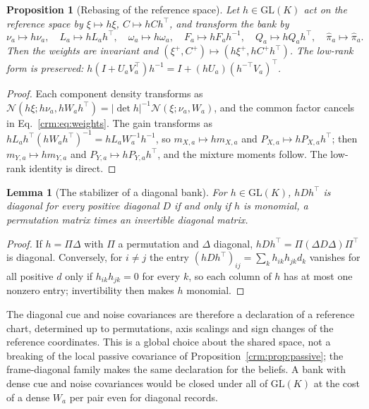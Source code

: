 \documentclass[11pt]{article}
\newtheorem{proposition}[theorem]{Proposition}
\newtheorem{lemma}[theorem]{Lemma}
\theoremstyle{definition}
\theoremstyle{remark}
\providecommand{\GL}{\mathrm{GL}}
\newcommand{\Gauss}{\mathcal N}
\newcommand{\pihat}{\hat\pi}
\begin{document}
\begin{proposition}[Rebasing of the reference space]
\label{crm:prop:rebasing}
Let $h\in\GL(K)$ act on the reference space by $\xi\mapsto h\xi$, $C\mapsto hCh^\top$, and transform the bank by
\begin{equation}
\nu_a\mapsto h\nu_a,\quad L_a\mapsto hL_ah^\top,\quad \omega_a\mapsto h\omega_a,\quad F_a\mapsto hF_ah^{-1},\quad Q_a\mapsto hQ_ah^\top,\quad \pihat_a\mapsto\pihat_a.
\label{crm:eq:rebasing}
\end{equation}
Then the weights are invariant and $(\xi^+,C^+)\mapsto(h\xi^+,hC^+h^\top)$. The low-rank form is preserved: $h(I+U_aV_a^\top)h^{-1}=I+(hU_a)(h^{-\top}V_a)^\top$.
\end{proposition}

\begin{proof}
Each component density transforms as $\Gauss(h\xi;h\nu_a,hW_ah^\top)=|\det h|^{-1}\Gauss(\xi;\nu_a,W_a)$, and the common factor cancels in Eq.~\eqref{crm:eq:weights}. The gain transforms as $hL_ah^\top(hW_ah^\top)^{-1}=hL_aW_a^{-1}h^{-1}$, so $m_{X,a}\mapsto hm_{X,a}$ and $P_{X,a}\mapsto hP_{X,a}h^\top$; then $m_{Y,a}\mapsto hm_{Y,a}$ and $P_{Y,a}\mapsto hP_{Y,a}h^\top$, and the mixture moments follow. The low-rank identity is direct.
\end{proof}

\begin{lemma}[The stabilizer of a diagonal bank]
\label{crm:lem:monomial}
For $h\in\GL(K)$, $hDh^\top$ is diagonal for every positive diagonal $D$ if and only if $h$ is monomial, a permutation matrix times an invertible diagonal matrix.
\end{lemma}

\begin{proof}
If $h=\Pi\Delta$ with $\Pi$ a permutation and $\Delta$ diagonal, $hDh^\top=\Pi(\Delta D\Delta)\Pi^\top$ is diagonal. Conversely, for $i\ne j$ the entry $(hDh^\top)_{ij}=\sum_kh_{ik}h_{jk}d_k$ vanishes for all positive $d$ only if $h_{ik}h_{jk}=0$ for every $k$, so each column of $h$ has at most one nonzero entry; invertibility then makes $h$ monomial.
\end{proof}

The diagonal cue and noise covariances are therefore a declaration of a reference chart, determined up to permutations, axis scalings and sign changes of the reference coordinates. This is a global choice about the shared space, not a breaking of the local passive covariance of Proposition~\ref{crm:prop:passive}; the frame-diagonal family makes the same declaration for the beliefs. A bank with dense cue and noise covariances would be closed under all of $\GL(K)$ at the cost of a dense $W_a$ per pair even for diagonal records.
\end{document}
